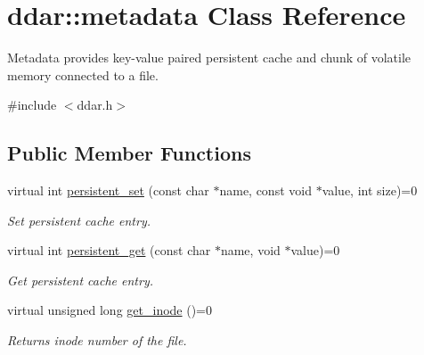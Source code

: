 \hypertarget{classddar_1_1metadata}{\section{ddar\-:\-:metadata \-Class \-Reference}
\label{classddar_1_1metadata}
}


\-Metadata provides key-\/value paired persistent cache and chunk of volatile memory connected to a file.  




{\ttfamily \#include $<$ddar.\-h$>$}

\subsection*{\-Public \-Member \-Functions}
\begin{DoxyCompactItemize}
\item 
virtual int \hyperlink{classddar_1_1metadata_a27dc324990551ef738296190d66b79ad}{persistent\-\_\-set} (const char $\ast$name, const void $\ast$value, int size)=0
\begin{DoxyCompactList}\small\item\em \-Set persistent cache entry. \end{DoxyCompactList}\item 
virtual int \hyperlink{classddar_1_1metadata_a2e4c99aa26e5f111a910d20297905bcf}{persistent\-\_\-get} (const char $\ast$name, void $\ast$value)=0
\begin{DoxyCompactList}\small\item\em \-Get persistent cache entry. \end{DoxyCompactList}\item 
\hypertarget{classddar_1_1metadata_ad42a2a17a192112e60871e3d7f8a3b65}{virtual unsigned long \hyperlink{classddar_1_1metadata_ad42a2a17a192112e60871e3d7f8a3b65}{get\-\_\-inode} ()=0}\label{classddar_1_1metadata_ad42a2a17a192112e60871e3d7f8a3b65}

\begin{DoxyCompactList}\small\item\em \-Returns inode number of the file. \end{DoxyCompactList}\end{DoxyCompactItemize}
